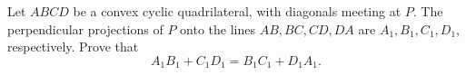 Let $ABCD$ be a convex cyclic quadrilateral, with diagonals meeting at $P$. The perpendicular projections of $P$ onto the lines $AB,BC,CD,DA$ are $A_1,B_1,C_1,D_1$, respectively. Prove that
\[A_1B_1+C_1D_1=B_1C_1+D_1A_1.\]
